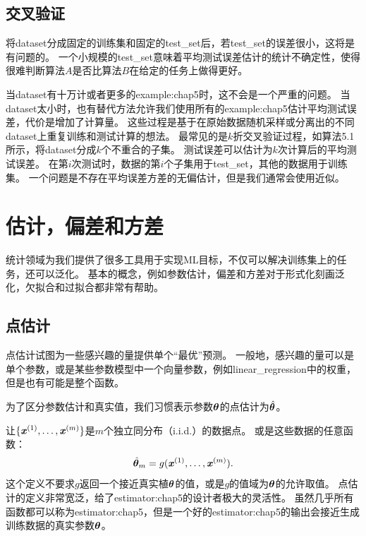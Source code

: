 \subsection{交叉验证}
\label{sec:cross_validation}
将\gls{dataset}分成固定的训练集和固定的\gls{test_set}后，若\gls{test_set}的误差很小，这将是有问题的。
一个小规模的\gls{test_set}意味着平均测试误差估计的统计不确定性，使得很难判断算法$A$是否比算法$B$在给定的任务上做得更好。


当\gls{dataset}有十万计或者更多的\gls{example:chap5}时，这不会是一个严重的问题。
当\gls{dataset}太小时，也有替代方法允许我们使用所有的\gls{example:chap5}估计平均测试误差，代价是增加了计算量。
这些过程是基于在原始数据随机采样或分离出的不同\gls{dataset}上重复训练和测试计算的想法。
最常见的是$k$折交叉验证过程，如算法5.1所示，将\gls{dataset}分成$k$个不重合的子集。
测试误差可以估计为$k$次计算后的平均测试误差。
在第$i$次测试时，数据的第$i$个子集用于\gls{test_set}，其他的数据用于训练集。
一个问题是不存在平均误差方差的无偏估计\citep{Bengio-Grandvalet-JMLR-04}，但是我们通常会使用近似。

\section{估计，偏差和方差}
\label{sec:estimators_bias_and_variance}
统计领域为我们提供了很多工具用于实现\gls{ML}目标，不仅可以解决训练集上的任务，还可以泛化。
基本的概念，例如参数估计，偏差和方差对于形式化刻画泛化，欠拟合和过拟合都非常有帮助。

\subsection{点估计}
\label{sec:point_estimation}
点估计试图为一些感兴趣的量提供单个“最优”预测。
一般地，感兴趣的量可以是单个参数，或是某些参数模型中一个向量参数，例如\gls{linear_regression}中的权重，但是也有可能是整个函数。

为了区分参数估计和真实值，我们习惯表示参数$\boldsymbol{\theta}$的点估计为$\hat{\boldsymbol{\theta}}$。

让$\{\boldsymbol{\mathit{x}}^{(1)},\dots,\boldsymbol{\mathit{x}}^{(m)}\}$是$m$个独立同分布（i.i.d.）的数据点。
或是这些数据的任意函数：
\begin{equation}
    \hat{\boldsymbol{\theta}}_m = g(\boldsymbol{\mathit{x}}^{(1)}, \dots, \boldsymbol{\mathit{x}}^{(m)}) .
\end{equation}
这个定义不要求$g$返回一个接近真实植$\boldsymbol{\theta}$的值，或是$g$的值域为$\boldsymbol{\theta}$的允许取值。
点估计的定义非常宽泛，给了\gls{estimator:chap5}的设计者极大的灵活性。
虽然几乎所有函数都可以称为\gls{estimator:chap5}，但是一个好的\gls{estimator:chap5}的输出会接近生成训练数据的真实参数$\boldsymbol{\theta}$。


